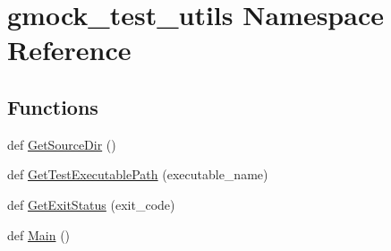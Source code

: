 \hypertarget{namespacegmock__test__utils}{}\section{gmock\+\_\+test\+\_\+utils Namespace Reference}
\label{namespacegmock__test__utils}
\subsection*{Functions}
\begin{DoxyCompactItemize}
\item 
def \mbox{\hyperlink{namespacegmock__test__utils_ab7217591e655e80392c9db6b99d04765}{Get\+Source\+Dir}} ()
\item 
def \mbox{\hyperlink{namespacegmock__test__utils_aadd2927024e24f0c53f7ba283402cdb1}{Get\+Test\+Executable\+Path}} (executable\+\_\+name)
\item 
def \mbox{\hyperlink{namespacegmock__test__utils_a9146f81ff42389086b3eaee25dbf0263}{Get\+Exit\+Status}} (exit\+\_\+code)
\item 
def \mbox{\hyperlink{namespacegmock__test__utils_ad79dc6aea3727ee23b5f5c454ef0d78a}{Main}} ()
\end{DoxyCompactItemize}
